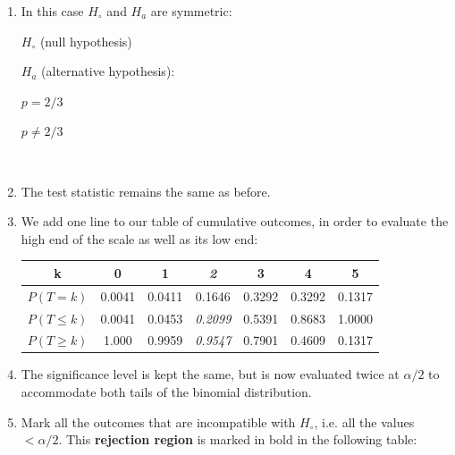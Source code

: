 \begin{enumerate}

\item In this case $H_\circ$ and $H_a$ are symmetric:\\

\noindent\begin{minipage}{.4\textwidth}
  $H_\circ$ (null hypothesis)
  
  \vspace{1em}
  
  $H_a$ (alternative hypothesis):
\end{minipage}
\begin{minipage}{.2\textwidth}
\end{minipage}
\begin{minipage}{.2\textwidth}
  $p=2/3$
  
  \vspace{1em}
  
  ${p}\neq{2/3}$
\end{minipage}
\begin{minipage}{.2\textwidth}
\end{minipage}\\

\item The test statistic remains the same as before.

\item We add one line to our table of cumulative outcomes, in order to
  evaluate the high end of the scale as well as its low end:

  \begin{center}
    \begin{tabular}{ccccccc}
      k & 0 & 1 & \textit{2} & 3 & 4 & 5 \\ \hline
      $P(T=k)$ & 0.0041 & 0.0411 & 0.1646 & 0.3292 & 0.3292 & 0.1317 \\
      $P({T}\leq{k})$ & 0.0041 & 0.0453 & \textit{0.2099} & 0.5391 & 0.8683 & 1.0000 \\
      $P({T}\geq{k})$ & 1.000 & 0.9959 & \textit{0.9547} & 0.7901 & 0.4609 & 0.1317
    \end{tabular}
  \end{center}
  
\item The significance level is kept the same, but is now evaluated
  twice at $\alpha/2$ to accommodate both tails of the binomial
  distribution.

\item Mark all the outcomes that are incompatible with $H_\circ$,
  i.e. all the values $<\alpha/2$.  This \textbf{rejection region} is
  marked in bold in the following table:


\end{enumerate}
